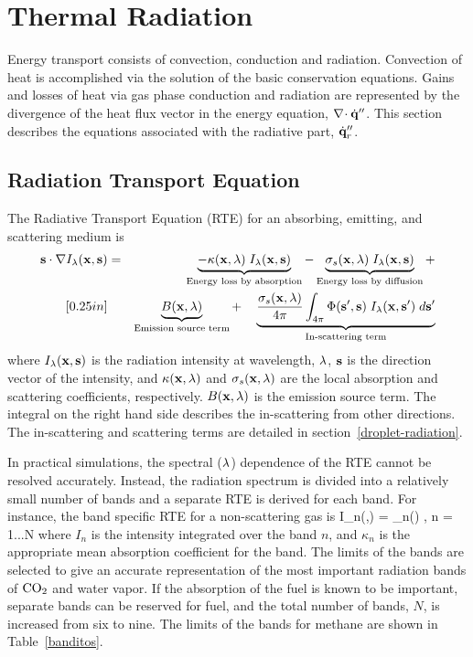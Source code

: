 
\chapter{Thermal Radiation}
\label{chapter:radiation}

Energy transport consists of convection, conduction and
radiation. Convection of heat is accomplished via the solution of the
basic conservation equations. Gains and losses of heat via gas phase conduction
and radiation are represented by the divergence of the heat flux
vector in the energy equation, $\nabla\!\cdot \dot{\bf q}''$. This section
describes the equations associated with the radiative part, $\dot{\bf q}''_r$.

\section{Radiation Transport Equation}

The Radiative Transport Equation (RTE) for an absorbing, emitting, and scattering medium is
\begin{eqnarray}
{\bf s} \cdot \nabla I_{\lambda}({\bf x},{\bf s}) &=&
\underbrace{ - \kappa({\bf x},\lambda)   \; I_\lambda({\bf x},{\bf s}) }_{\textrm{Energy loss by absorption}} -
\underbrace{\sigma_s({\bf x},\lambda) \; I_\lambda({\bf x},{\bf s}) }_{\textrm{Energy loss by diffusion}} +  \nonumber  \\ [0.25in]
& & \underbrace{   B({\bf x},\lambda) }_{\textrm{Emission source term}} + \quad
\underbrace{   \frac{\sigma_s({\bf x},\lambda)}{4\pi}
\int_{4\pi}\Phi({\bf s}',{\bf s}) \; I_{\lambda}({\bf x},{\bf s}') \; d{\bf s}'
 }_{\textrm{In-scattering term}}
\label{RTEbasic}
\end{eqnarray}
where $I_{\lambda}({\bf x},{\bf s})$ is the radiation intensity at wavelength,
$\lambda$, ${\bf s}$ is the direction vector of the intensity, and
$\kappa({\bf x},\lambda)$ and $\sigma_s({\bf x},\lambda)$ are the local absorption
and scattering coefficients,
respectively. $B({\bf x},\lambda)$ is the emission source term.
The integral on the
right hand side describes the in-scattering from other directions. The in-scattering and scattering terms are detailed in section~\ref{droplet-radiation}.

In practical simulations, the spectral ($\lambda$) dependence of the RTE cannot be resolved
accurately. Instead, the radiation spectrum is divided into
a relatively small number of bands and a separate RTE is derived for
each band. For instance, the band specific RTE for a non-scattering gas is
\be   \bs \cdot \nabla I_n(\bx,\bs) = \kappa_n(\bx) \;
        \left[ I_{b,n}(\bx) - I_n(\bx,\bs) \right],\;\; n = 1...N
\label{bandRTE} \ee
where $I_n$ is the intensity integrated over the band $n$, and $\kappa_n$
is the appropriate mean absorption coefficient for the band.
The limits of the bands are selected to give an accurate
representation of the most important radiation bands of $\rm CO_2$ and
water vapor. If the absorption of the fuel is known to be important,
separate bands can be reserved for fuel, and the total number of
bands, $N$, is increased from six to nine.
The limits of the bands for methane are shown in Table~\ref{banditos}.

